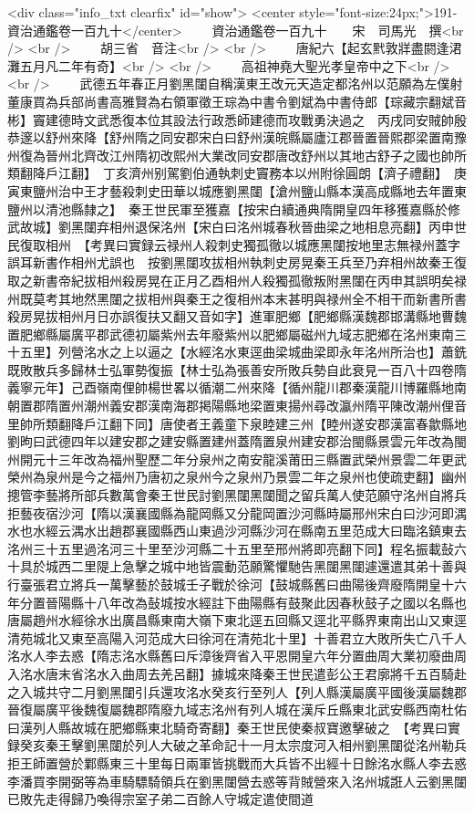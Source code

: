 <div class="info_txt clearfix" id="show">
<center style="font-size:24px;">191-資治通鑑卷一百九十</center>
  　　資治通鑑卷一百九十　　宋　司馬光　撰<br />
<br />
　　胡三省　音注<br />
<br />
　　唐紀六【起玄黓敦牂盡閼逢涒灘五月凡二年有奇】<br />
<br />
　　高祖神堯大聖光孝皇帝中之下<br />
<br />
　　武德五年春正月劉黑闥自稱漢東王改元天造定都洺州以范願為左僕射董康買為兵部尚書高雅賢為右領軍徵王琮為中書令劉斌為中書侍郎【琮藏宗翻斌音彬】竇建德時文武悉復本位其設法行政悉師建德而攻戰勇決過之　丙戌同安賊帥殷恭邃以舒州來降【舒州隋之同安郡宋白曰舒州漢皖縣屬廬江郡晉置晉熙郡梁置南豫州復為晉州北齊改江州隋初改熙州大業改同安郡唐改舒州以其地古舒子之國也帥所類翻降戶江翻】　丁亥濟州别駕劉伯通執刺史竇務本以州附徐圓朗【濟子禮翻】　庚寅東鹽州治中王才藝殺刺史田華以城應劉黑闥【滄州鹽山縣本漢高成縣地去年置東鹽州以清池縣隸之】　秦王世民軍至獲嘉【按宋白續通典隋開皇四年移獲嘉縣於修武故城】劉黑闥弃相州退保洺州【宋白曰洺州城春秋晉曲梁之地相息亮翻】丙申世民復取相州　【考異曰實録云禄州人殺刺史獨孤徹以城應黑闥按地里志無禄州蓋字誤耳新書作相州尤誤也　按劉黑闥攻拔相州執刺史房晃秦王兵至乃弃相州故秦王復取之新書帝紀拔相州殺房晃在正月乙酉相州人殺獨孤徹叛附黑闥在丙申其誤明矣禄州既莫考其地然黑闥之拔相州與秦王之復相州本末甚明與禄州全不相干而新書所書殺房晃拔相州月日亦誤復扶又翻又音如字】進軍肥鄉【肥鄉縣漢魏郡邯溝縣地曹魏置肥鄉縣屬廣平郡武德初屬紫州去年廢紫州以肥鄉屬磁州九域志肥鄉在洺州東南三十五里】列營洺水之上以逼之【水經洺水東逕曲梁城曲梁即永年洺州所治也】蕭銑既敗散兵多歸林士弘軍勢復振【林士弘為張善安所敗兵勢自此衰見一百八十四卷隋義寧元年】己酉嶺南俚帥楊世畧以循潮二州來降【循州龍川郡秦漢龍川博羅縣地南朝置郡隋置州潮州義安郡漢南海郡掲陽縣地梁置東揚州尋改瀛州隋平陳改潮州俚音里帥所類翻降戶江翻下同】唐使者王義童下泉睦建三州【睦州遂安郡漢富春歙縣地劉昫曰武德四年以建安郡之建安縣置建州蓋隋置泉州建安郡治閩縣景雲元年改為閩州開元十三年改為福州聖歷二年分泉州之南安龍溪莆田三縣置武榮州景雲二年更武榮州為泉州是今之福州乃唐初之泉州今之泉州乃景雲二年之泉州也使疏吏翻】幽州摠管李藝將所部兵數萬會秦王世民討劉黑闥黑闥聞之留兵萬人使范願守洺州自將兵拒藝夜宿沙河【隋以漢襄國縣為龍岡縣又分龍岡置沙河縣時屬邢州宋白曰沙河即湡水也水經云湡水出趙郡襄國縣西山東過沙河縣沙河在縣南五里范成大曰臨洺鎮東去洺州三十五里過洺河三十里至沙河縣二十五里至邢州將即亮翻下同】程名振載鼔六十具於城西二里隄上急擊之城中地皆震動范願驚懼馳告黑闥黑闥遽還遣其弟十善與行臺張君立將兵一萬擊藝於鼓城壬子戰於徐河【鼓城縣舊曰曲陽後齊廢隋開皇十六年分置晉陽縣十八年改為鼔城按水經註下曲陽縣有鼓聚此因春秋鼓子之國以名縣也唐屬趙州水經徐水出廣昌縣東南大嶺下東北逕五回縣又逕北平縣界東南出山又東逕清苑城北又東至高陽入河范成大曰徐河在清苑北十里】十善君立大敗所失亡八千人　洺水人李去惑【隋志洺水縣舊曰斥漳後齊省入平恩開皇六年分置曲周大業初廢曲周入洺水唐末省洺水入曲周去羌呂翻】據城來降秦王世民遣彭公王君廓將千五百騎赴之入城共守二月劉黑闥引兵還攻洺水癸亥行至列人【列人縣漢屬廣平國後漢屬魏郡晉復屬廣平後魏復屬魏郡隋廢九域志洺州有列人城在漢斥丘縣東北武安縣西南杜佑曰漢列人縣故城在肥鄉縣東北騎奇寄翻】秦王世民使秦叔寶邀擊破之　【考異曰實録癸亥秦王擊劉黑闥於列人大破之革命記十一月太宗度河入相州劉黑闥從洺州勒兵拒王師置營於鄴縣東三十里每日兩軍皆挑戰而大兵皆不出經十日餘洺水縣人李去惑李潘買李開弼等為車騎驃騎領兵在劉黑闥營去惑等背賊營來入洺州城誑人云劉黑闥已敗先走得歸乃喚得宗室子弟二百餘人守城定遣使間道